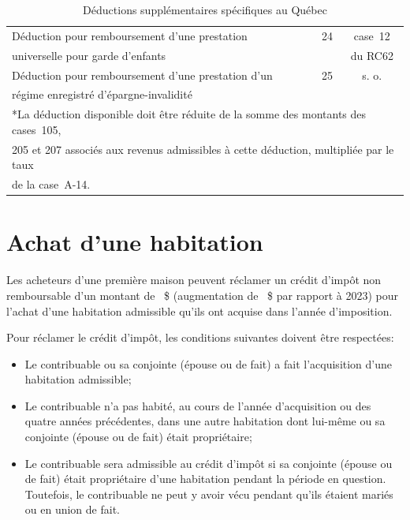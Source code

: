 \begin{table}
\begin{tabular}{|l|c|c|}
		Déduction pour remboursement d'une prestation            &      24       &             case~12              \\
		universelle pour garde d'enfants                         &               &             du RC62              \\ \hline
		Déduction pour remboursement d'une prestation d'un       &      25       &              s. o.               \\
		régime enregistré d'épargne-invalidité                   &               &                                  \\ \hline
		\multicolumn{3}{|l|}{*La déduction disponible doit être réduite de la somme des montants des cases~105,}    \\
		\multicolumn{3}{|l|}{205 et 207 associés aux revenus admissibles à cette déduction, multipliée par le taux} \\
		\multicolumn{3}{|l|}{de la case~A-14.}                                                                      \\ \hline
	\end{tabular}
	\caption{Déductions supplémentaires spécifiques au Québec}
	\label{table:deductionsSupplementairesSpecifiquesAuQuebec}
\end{table}




\section{Achat d'une habitation}
\begin{intro}
	Les acheteurs d'une première maison peuvent réclamer un crédit d'impôt non remboursable d'un montant de ~\$ (augmentation de ~\$ par rapport à 2023) pour l'achat d'une habitation admissible qu'ils ont acquise dans l'année d'imposition.
\end{intro}

Pour réclamer le crédit d'impôt, les conditions suivantes doivent être respectées:
\begin{itemize}
	\item Le contribuable ou sa conjointe (épouse ou de fait) a fait l'acquisition d'une habitation admissible; 
	\item Le contribuable n'a pas habité, au cours de l'année d'acquisition ou des quatre années précédentes, dans une autre habitation dont lui-même ou sa conjointe (épouse ou de fait) était propriétaire;
	\item Le contribuable sera admissible au crédit d'impôt si sa conjointe (épouse ou de fait) était propriétaire d'une habitation pendant la période en question. Toutefois, le contribuable ne peut y avoir vécu pendant qu'ils étaient mariés ou en union de fait.
\end{itemize}

